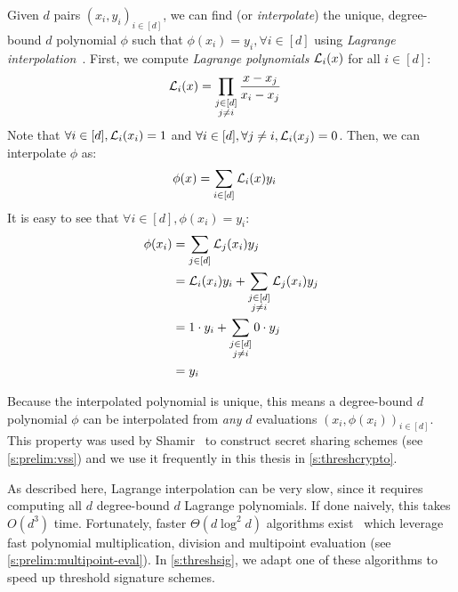 Given $d$ pairs $(x_i, y_i)_{i\in[d]}$, we can find (or \textit{interpolate}) the unique, degree-bound $d$ polynomial $\phi$ such that $\phi(x_i) = y_i, \forall i\in[d]$ using \textit{Lagrange interpolation}~\cite{BT04}.
First, we compute \textit{Lagrange polynomials} $\mathcal{L}_i(x)$ for all $i\in [d]$:
\begin{align}
\mathcal{L}_i(x) &= \prod_{\substack{j\in [d]\\j\ne i}}\frac{x-x_j}{x_i-x_j}
\end{align}
Note that $\forall i\in[d], \mathcal{L}_i(x_i) = 1$ and $\forall i\in[d],\forall j\ne i, \mathcal{L}_i(x_j)=0$.
Then, we can interpolate $\phi$ as:
\begin{align}
\phi(x) &= \sum_{i\in[d]} \mathcal{L}_i(x) y_i
\end{align}
It is easy to see that $\forall i\in [d], \phi(x_i) = y_i$:
\begin{align*}
\phi(x_i) &= \sum_{j\in[d]} \mathcal{L}_j(x_i) y_j\\
          &= \mathcal{L}_i(x_i)y_i + \sum_{\substack{j\in[d]\\j\ne i}} \mathcal{L}_j(x_i) y_j\\
          &= 1 \cdot y_i + \sum_{\substack{j\in[d]\\j\ne i}} 0 \cdot y_j\\
          &= y_i
\end{align*}

Because the interpolated polynomial is unique, this means a degree-bound $d$ polynomial $\phi$ can be interpolated from \textit{any} $d$ evaluations $(x_i, \phi(x_i))_{i\in[d]}$.
This property was used by Shamir~\cite{Shamir79} to construct secret sharing schemes (see \cref{s:prelim:vss}) and we use it frequently in this thesis in \cref{s:threshcrypto}.

As described here, Lagrange interpolation can be very slow, since it requires computing all $d$ degree-bound $d$ Lagrange polynomials.
If done naively, this takes $O(d^3)$ time.
Fortunately, faster $\Theta(d\log^2{d})$ algorithms exist~\cite{vG13ModernCh10} which leverage fast polynomial multiplication, division and multipoint evaluation (see \cref{s:prelim:multipoint-eval}).
In \cref{s:threshsig}, we adapt one of these algorithms to speed up threshold signature schemes.